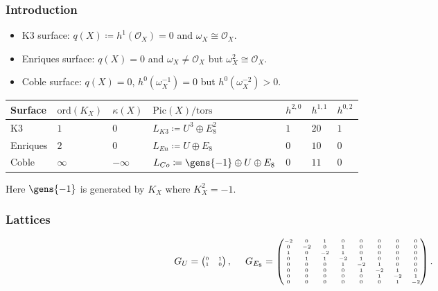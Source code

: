 \documentclass{beamer}
\begin{document}
{\begin{frame}
\frametitle{Introduction}
\begin{itemize}
\item K3 surface: \quad\hspace{0.6em} $q(X) \coloneqq h^1(\mathcal{O}_X) = 0$ and $\omega_X \cong \mathcal{O}_X$.
\item Enriques surface:  $q(X) = 0$ and $\omega_X \neq \mathcal{O}_X$ but $\omega_X^2 \cong \mathcal{O}_X$.
\item Coble surface: \hspace{1em} $q(X) = 0$, $h^0(\omega_X^{-1}) = 0$ but $h^0(\omega_X^{-2}) > 0$.
\end{itemize}
\vspace{1em}
\begin{centering}
{
\small
\begin{tabular}{l|llllll}
	Surface 	& $\mathrm{ord}(K_X)$ & $\kappa(X)$ 	& $\mathrm{Pic}(X)/\mathrm{tors}$ & $h^{2, 0}$ 
		& $h^{1,1}$ & $h^{0, 2}$ \\ \hline
	K3 			& $1$ & $0$ 			& $L_{K3} \coloneqq U^3 \oplus E_8^2$ 
		& $1$ & $20$ & $1$ \\
	Enriques 	& $2$ & $0$ 			& $L_{En} \coloneqq U \oplus E_8$ 
		& $0$ & $10$ & $0$ \\
	Coble 		& $\infty$ & $-\infty$ 		& $L_{Co} \coloneqq \gens{-1} \oplus U \oplus E_8$
		& $0$ & $11$ & $0$ \\
\end{tabular}
}
\end{centering}
\newline
{\small
\newline
Here $\gens{-1}$ is generated by $K_X$ where $K_X^2 = -1$.
}
\end{frame}
\begin{frame}\frametitle{Lattices}
{
\[
\tiny 
G_U = \begin{pmatrix} 0 & 1 \\ 1 & 0 \end{pmatrix}, \qquad
G_{E_8}
=
\begin{pmatrix}
 -2 &  0 & 1 &  0 &  0 &  0 &  0 &  0 \\
 0 &  -2 &  0 & 1 &  0 &  0 &  0 &  0 \\
1 &  0 &  -2 & 1 &  0 &  0 &  0 &  0 \\
 0 & 1 & 1 &  -2 & 1 &  0 &  0 &  0 \\
 0 &  0 &  0 & 1 &  -2 & 1 &  0 &  0 \\
 0 &  0 &  0 &  0 & 1 &  -2 & 1 &  0 \\
 0 &  0 &  0 &  0 &  0 & 1 &  -2 & 1 \\
 0 &  0 &  0 &  0 &  0 &  0 & 1 &  -2
\end{pmatrix}.
\]
}


\end{frame}}
\end{document}

